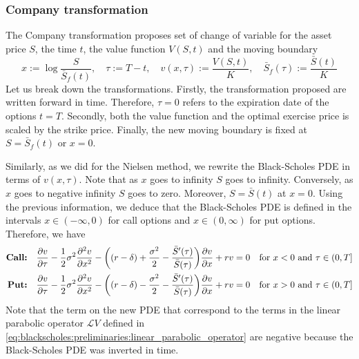 \subsubsection{Company transformation}
The Company transformation proposes set of change of variable for the asset price $S$, the time $t$, the value function $V(S,t)$ and the moving boundary
\begin{equation}
  x := \log \dfrac{S}{\bar{S}_f(t)}, \quad \tau := T - t, \quad v(x, \tau) := \dfrac{V(S, t)}{K}, \quad \bar{S}_f(\tau) := \dfrac{\bar{S}(t)}{K} 
\end{equation}
Let us break down the transformations. Firstly, the transformation proposed are written forward in time. Therefore, $\tau = 0$ refers to the expiration date of the options $t=T$. Secondly, both the value function and the optimal exercise price is scaled by the strike price. Finally, the new moving boundary is fixed at $S=\bar{S}_f(t)$ or $x=0$.

Similarly, as we did for the Nielsen method, we rewrite the Black-Scholes PDE in terms of $v(x, \tau)$. Note that as $x$ goes to infinity $S$ goes to infinity. Conversely, as $x$ goes to negative infinity $S$ goes to zero. Moreover, $S=\bar{S}(t)$ at $x=0$. Using the previous information, we deduce  that the Black-Scholes PDE is defined in the intervals $x\in(-\infty, 0)$ for call options and $x\in(0, \infty)$ for put options. Therefore, we have
\begin{subequations}
  \begin{align}
      \text{\textbf{Call:}} \quad \dfrac{\partial v}{\partial \tau} - \dfrac{1}{2}\sigma^2\dfrac{\partial^2 v}{\partial x^2} - \bigg((r-\delta) + \dfrac{\sigma^2}{2} - \dfrac{\bar{S}'(\tau)}{\bar{S}(\tau)} \bigg)\dfrac{\partial v}{\partial x} + rv = 0 \quad \text{for $x < 0$ and $\tau \in (0, T]$} \\
      \text{\textbf{Put:}} \quad \dfrac{\partial v}{\partial \tau} - \dfrac{1}{2}\sigma^2\dfrac{\partial^2 v}{\partial x^2} - \bigg((r-\delta) - \dfrac{\sigma^2}{2} - \dfrac{\bar{S}'(\tau)}{\bar{S}(\tau)} \bigg)\dfrac{\partial v}{\partial x} + rv = 0 \quad \text{for $x > 0$ and $\tau \in (0, T]$}
  \end{align}
\end{subequations}
Note that the term on the new PDE that correspond to the terms in the linear parabolic operator $\mathcal{L}V$ defined in \eqref{eq:blackscholes:preliminaries:linear_parabolic_operator} are negative because the Black-Scholes PDE was inverted in time.

